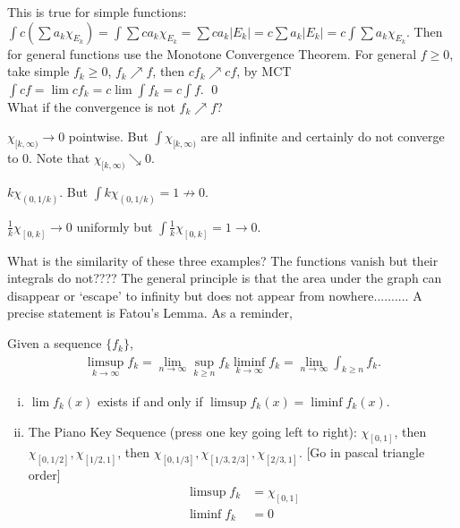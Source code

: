 \pf This is true for simple functions: $\int c (\sum a_k \chi_{E_k})= \int \sum c a_k \chi_{E_k} = \sum c a_k |E_k| = c \sum a_k |E_k| = c \int \sum a_k \chi_{E_k}$. Then for general functions use the Monotone Convergence Theorem. For general $f \geq 0$, take simple $f_k \geq 0$, $f_k \nearrow f$, then $c f_k \nearrow cf$, by MCT $\int cf= \lim cf_k = c \lim \int f_k = c \int f$. \qed \\


What if the convergence is not $f_k \nearrow f$? 

\begin{ex}
$\chi_{[k,\infty)} \to 0$ pointwise. But $\int \chi_{[k,\infty)}$ are all infinite and certainly do not converge to $0$. Note that $\chi_{[k,\infty)} \searrow 0$. 
\end{ex}


\begin{ex}
$k \chi_{(0,1/k)}$. But $\int k \chi_{(0,1/k)} =1 \not\to 0$. 

\end{ex}


\begin{ex}
$\frac{1}{k} \chi_{[0,k]} \to 0$ uniformly but $\int \frac{1}{k} \chi_{[0,k]}= 1 \to 0$. 

\end{ex}


What is the similarity of these three examples? The functions vanish but their integrals do not???? The general principle is that the area under the graph can disappear or `escape' to infinity but does not appear from nowhere.......... A precise statement is Fatou's Lemma. As a reminder,


\begin{dfn}
Given a sequence $\{f_k\}$,
	\[
	\begin{split}
	\limsup_{k \to \infty} f_k = \lim_{n \to \infty} \sup_{k \geq n} f_k
	\liminf_{k \to \infty} f_k = \lim_{n \to \infty} \int_{k \geq n} f_k.
	\end{split}
	\]
\end{dfn}


\begin{ex}
\begin{enumerate}[(i)]
\item $\lim f_k(x)$ exists if and only if $\limsup f_k(x)= \liminf f_k(x)$. 
\item The Piano Key Sequence (press one key going left to right): $\chi_{[0,1]}$, then $\chi_{[0,1/2]}, \chi_{[1/2,1]}$, then $\chi_{[0,1/3]}, \chi_{[1/3,2/3]}, \chi_{[2/3,1]}$. [Go in pascal triangle order]
	\[
	\begin{split}
	\limsup f_k&= \chi_{[0,1]} \\
	\liminf f_k&= 0
	\end{split}
	\]
\end{enumerate}
\end{ex}


